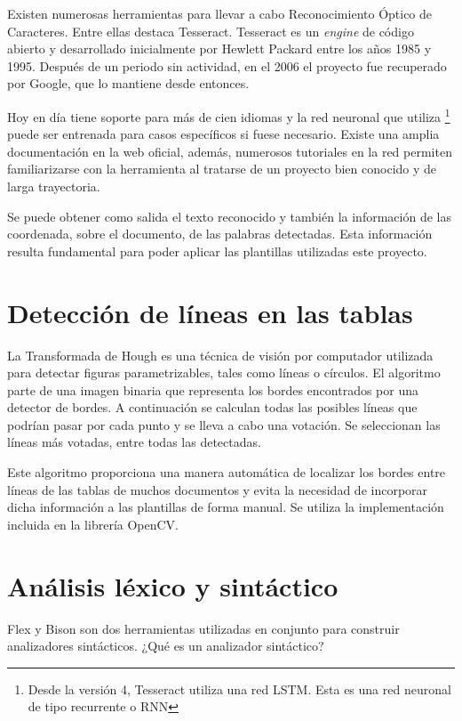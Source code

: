 Existen numerosas herramientas para llevar a cabo Reconocimiento Óptico de Caracteres. Entre ellas destaca Tesseract. Tesseract es un \emph{engine} de código abierto y desarrollado inicialmente por Hewlett Packard entre los años 1985 y 1995. Después de un periodo sin actividad, en el 2006 el proyecto fue recuperado por Google, que lo mantiene desde entonces.

Hoy en día tiene soporte para más de cien idiomas y la red neuronal que utiliza \footnote{Desde la versión 4, Tesseract utiliza una red LSTM. Esta es una red neuronal de tipo recurrente o RNN} puede ser entrenada para casos específicos si fuese necesario. Existe una amplia documentación en la web oficial, además, numerosos tutoriales en la red permiten familiarizarse con la herramienta al tratarse de un proyecto bien conocido y de larga trayectoria.

Se puede obtener como salida el texto reconocido y también la información de las coordenada, sobre el documento, de las palabras detectadas. Esta información resulta fundamental para poder aplicar las plantillas utilizadas este proyecto.

\section{Detección de líneas en las tablas}

La Transformada de Hough es una técnica de visión por computador utilizada para detectar figuras parametrizables, tales como líneas o círculos. El algoritmo parte de una imagen binaria que representa los bordes encontrados por una detector de bordes. A continuación se calculan todas las posibles líneas que podrían pasar por cada punto y se lleva a cabo una votación. Se seleccionan las líneas más votadas, entre todas las detectadas.

Este algoritmo proporciona una manera automática de localizar los bordes entre líneas de las tablas de muchos documentos y evita la necesidad de incorporar dicha información a las plantillas de forma manual. Se utiliza la implementación incluida en la librería OpenCV.

\section{Análisis léxico y sintáctico}

Flex y Bison son dos herramientas utilizadas en conjunto para construir analizadores sintácticos. ¿Qué es un analizador sintáctico?

